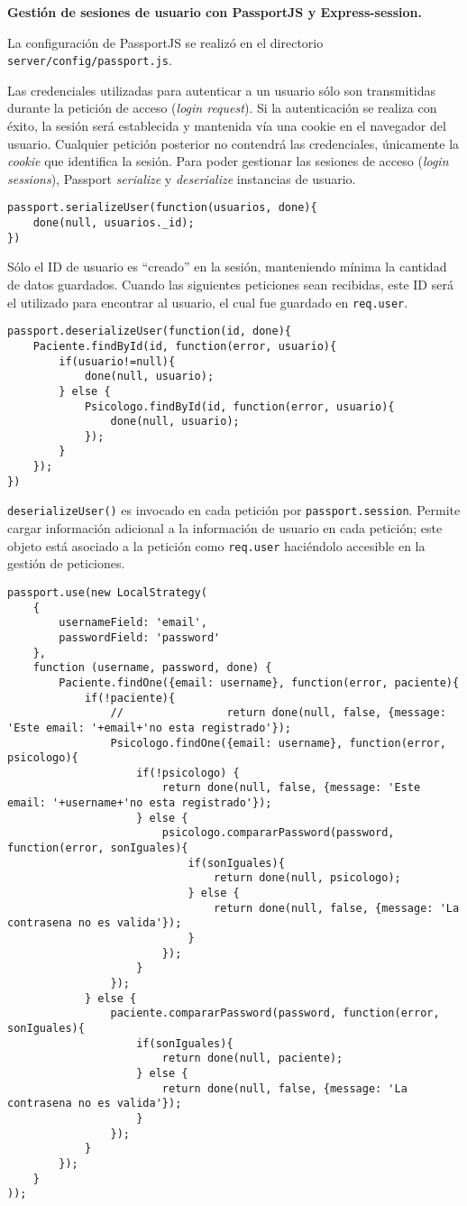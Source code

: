  
\textbf{Gestión de sesiones de usuario con PassportJS y Express-session\cite{passport}.}


La configuración de PassportJS se realizó en el directorio \\ \texttt{server/config/passport.js}.


Las credenciales utilizadas para autenticar a un usuario sólo son transmitidas durante la petición de acceso (\textit{login request}). Si la autenticación se realiza con éxito, la sesión será establecida y mantenida vía una cookie en el navegador del usuario.
Cualquier petición posterior no contendrá las credenciales, únicamente la \textit{cookie} que identifica la sesión. 
Para poder gestionar las sesiones de acceso (\textit{login sessions}), Passport \textit{serialize} y \textit{deserialize} instancias de usuario.


\medskip
\begin{lstlisting}
passport.serializeUser(function(usuarios, done){
	done(null, usuarios._id);
})
\end{lstlisting}


Sólo el ID de usuario es ``creado'' en la sesión, manteniendo mínima la cantidad de datos guardados. Cuando las siguientes peticiones sean recibidas, este ID será el utilizado para encontrar al usuario, el cual fue guardado en \texttt{req.user}.


\medskip
\begin{lstlisting}
passport.deserializeUser(function(id, done){
	Paciente.findById(id, function(error, usuario){
		if(usuario!=null){
			done(null, usuario);
		} else {
			Psicologo.findById(id, function(error, usuario){
				done(null, usuario);
			});
		}
	});
})
\end{lstlisting}

\texttt{deserializeUser()} es invocado en cada petición por \texttt{passport.session}. Permite cargar información adicional a la información de usuario en cada petición; este objeto está asociado a la petición como \texttt{req.user} haciéndolo accesible en la gestión de peticiones.


\medskip
\begin{lstlisting}
passport.use(new LocalStrategy(    
	{
		usernameField: 'email',
		passwordField: 'password'
	},
	function (username, password, done) {   
		Paciente.findOne({email: username}, function(error, paciente){
			if(!paciente){
				//                return done(null, false, {message: 'Este email: '+email+'no esta registrado'});
				Psicologo.findOne({email: username}, function(error, psicologo){
					if(!psicologo) {
						return done(null, false, {message: 'Este email: '+username+'no esta registrado'});
					} else {
						psicologo.compararPassword(password, function(error, sonIguales){
							if(sonIguales){
								return done(null, psicologo);
							} else {
								return done(null, false, {message: 'La contrasena no es valida'});
							}
						});
					}
				});
			} else {
				paciente.compararPassword(password, function(error, sonIguales){
					if(sonIguales){
						return done(null, paciente);
					} else {
						return done(null, false, {message: 'La contrasena no es valida'});
					}
				});
			}
		});
	}
));
\end{lstlisting}


